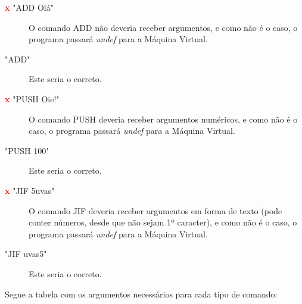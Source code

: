 \documentclass[a4paper]{article}
\begin{document}
    \begin{description}


        \item [\textbf{\textcolor{red}{x}} "ADD Olá"] 
        O comando ADD não deveria receber argumentos, e como não é o 
        caso, o programa passará \emph{undef} para a Máquina Virtual.
        
        \item [\textcolor{green}{\checkmark} "ADD"] 
        Este seria o correto.
        
        \item[] %
        
        \item [\textbf{\textcolor{red}{x}} "PUSH Oie!"] 
        O comando PUSH deveria receber argumentos numéricos, e como não é 
        o caso, o programa passará \emph{undef} para a Máquina Virtual.
    
        \item [\textcolor{green}{\checkmark} "PUSH 100"] 
        Este seria o correto.
        
        \item[] %
        
        \item [\textbf{\textcolor{red}{x}} "JIF 5uvas"] 
        O comando JIF deveria receber argumentos em forma de texto (pode
        conter números, desde que não sejam 1º caracter), e como não é o
        caso, o programa passará \emph{undef} para a Máquina Virtual.
        
        \item [\textcolor{green}{\checkmark} "JIF uvas5"] 
        Este seria o correto.


    \end{description}

    \bigskip\bigskip

    Segue a tabela com os argumentos necessários para cada tipo de 
    comando:
    
\end{document}
